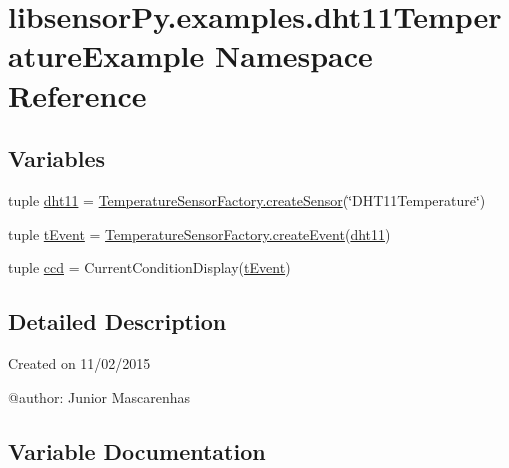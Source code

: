 \hypertarget{namespacelibsensorPy_1_1examples_1_1dht11TemperatureExample}{}\section{libsensor\+Py.\+examples.\+dht11\+Temperature\+Example Namespace Reference}
\label{namespacelibsensorPy_1_1examples_1_1dht11TemperatureExample}
\subsection*{Variables}
\begin{DoxyCompactItemize}
\item 
tuple \hyperlink{namespacelibsensorPy_1_1examples_1_1dht11TemperatureExample_ac079f6bb33b701ef7b3064d66cf363a3}{dht11} = \hyperlink{classconcretefactory_1_1temperatureSensorFactory_1_1TemperatureSensorFactory_a10da40452b9fced7f217c6716e8d5ecc}{Temperature\+Sensor\+Factory.\+create\+Sensor}(\char`\"{}D\+H\+T11\+Temperature\char`\"{})
\item 
tuple \hyperlink{namespacelibsensorPy_1_1examples_1_1dht11TemperatureExample_a9c5872a6f21b4ef6be39ee6219088d6e}{t\+Event} = \hyperlink{classconcretefactory_1_1temperatureSensorFactory_1_1TemperatureSensorFactory_a1a774f01c56394abf98e4b4f44e7b25f}{Temperature\+Sensor\+Factory.\+create\+Event}(\hyperlink{namespacelibsensorPy_1_1examples_1_1dht11TemperatureExample_ac079f6bb33b701ef7b3064d66cf363a3}{dht11})
\item 
tuple \hyperlink{namespacelibsensorPy_1_1examples_1_1dht11TemperatureExample_af0b4fb6c06fcff682ba493eac4c04f2e}{ccd} = Current\+Condition\+Display(\hyperlink{namespacelibsensorPy_1_1examples_1_1dht11TemperatureExample_a9c5872a6f21b4ef6be39ee6219088d6e}{t\+Event})
\end{DoxyCompactItemize}


\subsection{Detailed Description}
\begin{DoxyVerb}Created on 11/02/2015

@author: Junior Mascarenhas
\end{DoxyVerb}
 

\subsection{Variable Documentation}
\hypertarget{namespacelibsensorPy_1_1examples_1_1dht11TemperatureExample_af0b4fb6c06fcff682ba493eac4c04f2e}{}
